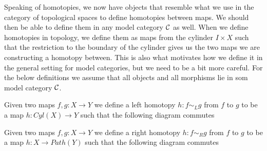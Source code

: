 Speaking of homotopies, we now have objects that resemble what we use in the category of topological spaces to define homotopies between maps. We should then be able to define them in any model category $\mathcal{C}$ as well. When we define homotopies in topology, we define them as maps from the cylinder $I\times X$ such that the restriction to the boundary of the cylinder gives us the two maps we are constructing a homotopy between. This is also what motivates how we define it in the general setting for model categories, but we need to be a bit more careful. For the below definitions we assume that all objects and all morphisms lie in som model category $\mathcal{C}$.

\begin{definition}
\label{def:left_homotopy}
Given two maps $f,g: X\longrightarrow Y$ we define a left homotopy $h:f\sim_L g$ from $f$ to $g$ to be a map $h: Cyl(X)\longrightarrow Y$ such that the following diagram commutes
\begin{center}
\end{center}
\end{definition}

\begin{definition}
\label{def:right_homotopy}
Given two maps $f,g: X\longrightarrow Y$ we define a right homotopy $h:f\sim_R g$ from $f$ to $g$ to be a map $h: X\longrightarrow Path(Y)$ such that the following diagram commutes
\begin{center}
\end{center}
\end{definition}

